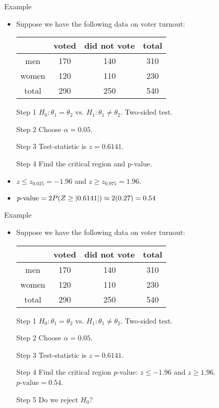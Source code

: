 \documentclass[10pt, handout, xcolor=table]{beamer}
\DeclarePairedDelimiter\abs{\lvert}{\rvert}%
\begin{document}
\begin{frame}{Example}
\begin{itemize}
\setlength{\itemsep}{8pt}
\item Suppose we have the following data on voter turnout:
\medskip
{\footnotesize
\begin{table}[]
\begin{tabular}{|c|cc|c|}
\hline
      & voted & did not vote & total \\ \hline
men   & 170 & 140       & 310  \\ 
women & 120 & 110        & 230  \\ \hline
total & 290  & 250        & 540     \\ \hline
\end{tabular}
\end{table}
}
\item[Step 1] $H_0: \theta_1 = \theta_2$ vs. $H_1: \theta_1 \neq \theta_2$. Two-sided test. 
\item[Step 2] Choose $\alpha = 0.05$. 
\item[Step 3] Test-statistic is $z = 0.6141$.
\item[Step 4] Find the critical region and p-value.
\item<2->[] $ z \leq z_{0.025} = -1.96$ and $z \geq z_{0.975} = 1.96$.
\item<3->[] $p\text{-value} = 2P(Z \geq \abs{0.6141}) \approx 2(0.27) = 0.54$
\end{itemize}
\end{frame}

\begin{frame}{Example}
\begin{itemize}
\setlength{\itemsep}{12pt}
\item Suppose we have the following data on voter turnout:
\medskip
{\footnotesize
\begin{table}[]
\begin{tabular}{|c|cc|c|}
\hline
      & voted & did not vote & total \\ \hline
men   & 170 & 140       & 310  \\ 
women & 120 & 110        & 230  \\ \hline
total & 290  & 250        & 540     \\ \hline
\end{tabular}
\end{table}
}
\item[Step 1] $H_0: \theta_1 = \theta_2$ vs. $H_1: \theta_1 \neq \theta_2$. Two-sided test.      
\item[Step 2] Choose $\alpha = 0.05$. 
\item[Step 3] Test-statistic is $z = 0.6141$.
\item[Step 4] Find the critical region $p$-value: $z \leq -1.96$ and $z \geq 1.96$. $p\text{-value} = 0.54$.
\item[Step 5] Do we reject $H_0$? 
\end{itemize}
\end{frame}
\end{document}
